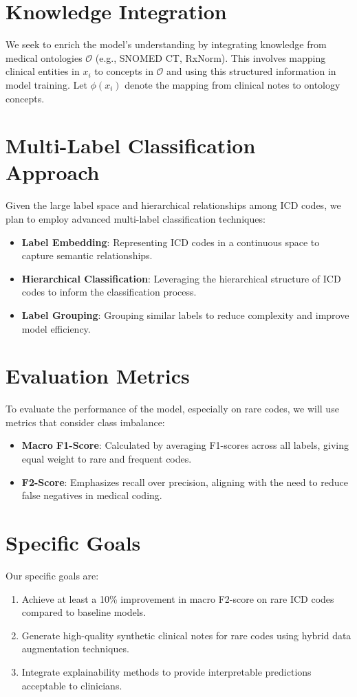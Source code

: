 \documentclass[12pt,a4paper]{report}
\begin{document}
\section{Knowledge Integration}
We seek to enrich the model's understanding by integrating knowledge from medical ontologies \( \mathcal{O} \) (e.g., SNOMED CT, RxNorm). This involves mapping clinical entities in \( x_i \) to concepts in \( \mathcal{O} \) and using this structured information in model training. Let \( \phi(x_i) \) denote the mapping from clinical notes to ontology concepts.

\section{Multi-Label Classification Approach}
Given the large label space and hierarchical relationships among ICD codes, we plan to employ advanced multi-label classification techniques:
\begin{itemize}
    \item \textbf{Label Embedding}: Representing ICD codes in a continuous space to capture semantic relationships.
    \item \textbf{Hierarchical Classification}: Leveraging the hierarchical structure of ICD codes to inform the classification process.
    \item \textbf{Label Grouping}: Grouping similar labels to reduce complexity and improve model efficiency.
\end{itemize}

\section{Evaluation Metrics}
To evaluate the performance of the model, especially on rare codes, we will use metrics that consider class imbalance:
\begin{itemize}
    \item \textbf{Macro F1-Score}: Calculated by averaging F1-scores across all labels, giving equal weight to rare and frequent codes.
    \item \textbf{F2-Score}: Emphasizes recall over precision, aligning with the need to reduce false negatives in medical coding.
\end{itemize}

\section{Specific Goals}
Our specific goals are:
\begin{enumerate}
    \item Achieve at least a 10\% improvement in macro F2-score on rare ICD codes compared to baseline models.
    \item Generate high-quality synthetic clinical notes for rare codes using hybrid data augmentation techniques.
    \item Integrate explainability methods to provide interpretable predictions acceptable to clinicians.
\end{enumerate}
\end{document}
